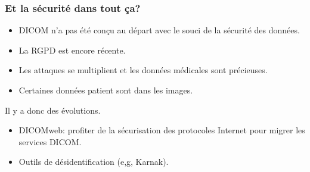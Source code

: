\frame
{
	\frametitle{Et la s\'ecurit\'e dans tout \c ca?}
	\begin{itemize}
		\item DICOM n'a pas \'et\'e con\c cu au d\'epart avec le souci de la s\'ecurit\'e des donn\'ees.
		\item La RGPD est encore r\'ecente.
		\item Les attaques se multiplient et les donn\'ees m\'edicales sont pr\'ecieuses.
		\item Certaines donn\'ees patient sont dans les images.
	\end{itemize}
	Il y a donc des \'evolutions.
	\begin{itemize}
		\item<2-> DICOMweb\texttrademark: profiter de la s\'ecurisation des protocoles Internet pour migrer les services DICOM.
		\item<3-> Outils de d\'esidentification (e,g, Karnak).
	\end{itemize}
}

			

